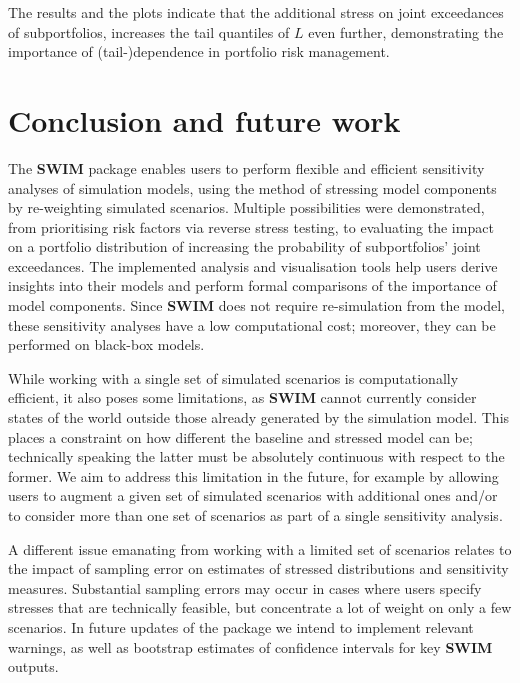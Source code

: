 \documentclass[
]{article}
\begin{document}
The results and the plots indicate that the additional stress on joint exceedances of subportfolios, increases the tail quantiles of \(L\) even further, demonstrating the importance of (tail-)dependence in portfolio risk management.

\hypertarget{conclusion-and-future-work}{%
\section{Conclusion and future work}\label{conclusion-and-future-work}}

The \textbf{SWIM} package enables users to perform flexible and efficient sensitivity analyses of simulation models, using the method of stressing model components by re-weighting simulated scenarios. Multiple possibilities were demonstrated, from prioritising risk factors via reverse stress testing, to evaluating the impact on a portfolio distribution of increasing the probability of subportfolios' joint exceedances. The implemented analysis and visualisation tools help users derive insights into their models and perform formal comparisons of the importance of model components. Since \textbf{SWIM} does not require re-simulation from the model, these sensitivity analyses have a low computational cost; moreover, they can be performed on black-box models.

While working with a single set of simulated scenarios is computationally efficient, it also poses some limitations, as \textbf{SWIM} cannot currently consider states of the world outside those already generated by the simulation model. This places a constraint on how different the baseline and stressed model can be; technically speaking the latter must be absolutely continuous with respect to the former. We aim to address this limitation in the future, for example by allowing users to augment a given set of simulated scenarios with additional ones and/or to consider more than one set of scenarios as part of a single sensitivity analysis.

A different issue emanating from working with a limited set of scenarios relates to the impact of sampling error on estimates of stressed distributions and sensitivity measures. Substantial sampling errors may occur in cases where users specify stresses that are technically feasible, but concentrate a lot of weight on only a few scenarios. In future updates of the package we intend to implement relevant warnings, as well as bootstrap estimates of confidence intervals for key \textbf{SWIM} outputs.
\end{document}
